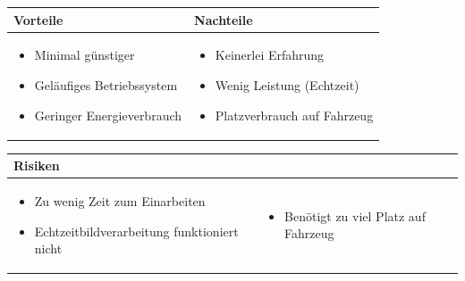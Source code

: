 \begin{table}[h]
\begin{tabular}{p{} | p{}}


 \textbf{Vorteile} & \textbf{Nachteile} \\ \hline
	 
\begin{itemize}
\item Minimal günstiger
\item Geläufiges Betriebssystem
\item Geringer Energieverbrauch
\end{itemize}

 
 &
 
\begin{itemize}
\item Keinerlei Erfahrung
\item Wenig Leistung (Echtzeit)
\item Platzverbrauch auf Fahrzeug
\end{itemize}

\end{tabular}
\end{table}

\begin{table}[h]
\begin{tabular}{p{}p{}}


 \textbf{Risiken} & \\ \hline
	 
\begin{itemize}
\item Zu wenig Zeit zum Einarbeiten
\item Echtzeitbildverarbeitung funktioniert nicht
\end{itemize}
&
\begin{itemize}
\item Benötigt zu viel Platz auf Fahrzeug
\end{itemize}

 
\end{tabular}
\end{table}

\pagebreak